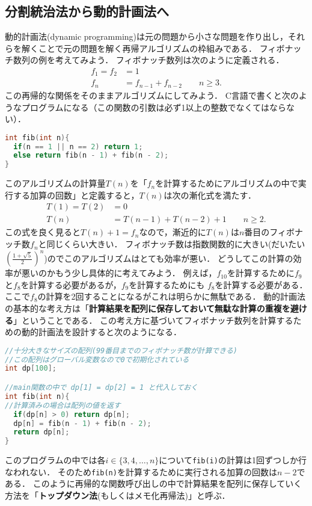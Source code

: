 \documentclass[a4paper,twoside,onecolumn,openany,article]{memoir}
\theoremstyle{remark}
\begin{document}
\subsection{分割統治法から動的計画法へ}
動的計画法(dynamic programming)は元の問題から小さな問題を作り出し，それらを解くことで元の問題を解く再帰アルゴリズムの枠組みである．
フィボナッチ数列の例を考えてみよう．
フィボナッチ数列は次のように定義される．
\begin{align*}
f_1=f_2&=1\\
f_n&=f_{n-1}+f_{n-2}\qquad n\ge 3.
\end{align*}
この再帰的な関係をそのままアルゴリズムにしてみよう．
C言語で書くと次のようなプログラムになる（この関数の引数は必ず1以上の整数でなくてはならない）．
\begin{lstlisting}[basicstyle=\ttfamily\small,showstringspaces=false,language=C,frame=single]
int fib(int n){
  if(n == 1 || n == 2) return 1;
  else return fib(n - 1) + fib(n - 2);
}
\end{lstlisting}
このアルゴリズムの計算量$T(n)$を「$f_n$を計算するためにアルゴリズムの中で実行する加算の回数」と定義すると，$T(n)$は次の漸化式を満たす．
\begin{align*}
T(1)=T(2)&=0\\
T(n)&=T(n-1)+T(n-2) + 1\qquad n\ge 2.
\end{align*}
この式を良く見ると$T(n)+1=f_n$なので，漸近的に$T(n)$は$n$番目のフィボナッチ数$f_n$と同じくらい大きい．
フィボナッチ数は指数関数的に大きい(だいたい$\left(\frac{1+\sqrt{5}}2\right)^n$)のでこのアルゴリズムはとても効率が悪い．
どうしてこの計算の効率が悪いのかもう少し具体的に考えてみよう．
例えば，$f_{10}$を計算するために$f_9$と$f_8$を計算する必要があるが，$f_9$を計算するためにも
$f_8$を計算する必要がある．ここで$f_8$の計算を2回することになるがこれは明らかに無駄である．
動的計画法の基本的な考え方は「\textbf{計算結果を配列に保存しておいて無駄な計算の重複を避ける}」ということである．
この考え方に基づいてフィボナッチ数列を計算するための動的計画法を設計すると次のようになる．
\begin{lstlisting}[basicstyle=\ttfamily\small,showstringspaces=false,language=C,frame=single]
//十分大きなサイズの配列(99番目までのフィボナッチ数が計算できる)
//この配列はグローバル変数なので0で初期化されている
int dp[100];

//main関数の中で dp[1] = dp[2] = 1 と代入しておく
int fib(int n){
//計算済みの場合は配列の値を返す
  if(dp[n] > 0) return dp[n];
  dp[n] = fib(n - 1) + fib(n - 2);
  return dp[n];
}
\end{lstlisting}
このプログラムの中では各$i\in \{3,4,\dotsc, n\}$について\texttt{fib(i)}の計算は1回ずつしか行なわれない．
そのため\texttt{fib(n)}を計算するために実行される加算の回数は$n-2$である．
このように再帰的な関数呼び出しの中で計算結果を配列に保存していく方法を「\textbf{トップダウン法}(もしくはメモ化再帰法)」と呼ぶ．
\end{document}
